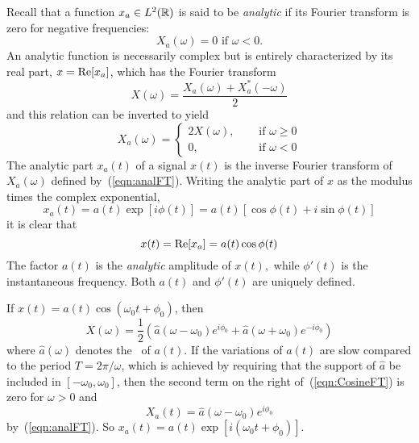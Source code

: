 Recall that 
a function $x_a \in L^2(\mathbb{R})$ is said to be \emph{analytic} if its
Fourier transform is zero for negative frequencies:
\[X_a(\omega) = 0 \text{ if } \omega < 0.\]
An analytic function is necessarily complex but is entirely
characterized by its real part, $x = \mbox{Re}[x_a]$, which has the
Fourier transform
\[X(\omega) = \frac{X_a(\omega) +
X^*_a(-\omega)}{2}\]
and this relation can be inverted to yield
\begin{equation}%
X_a(\omega) = 
    \left\{ \begin{array}{ll}
        2 X(\omega),& \quad \text{ if } \omega \geq 0\\
        0, & \quad \text{ if } \omega < 0
        \end{array} 
    \right.
\end{equation}
The analytic part $x_a(t)$ of a signal $x(t)$ is the inverse Fourier
transform of $X_a(\omega)$ defined by~(\ref{eqn:analFT}).
Writing the analytic part of $x$ as the modulus times the complex
exponential,
\[x_a(t) = a(t)\exp[i\phi(t)] = a(t)[\cos\phi(t) + i \sin\phi(t)]\]
it is clear that 
\[x(t) = \mbox{Re}[x_a] = a(t)\cos\phi(t)\]
The factor $a(t)$ is the \emph{analytic} amplitude of $x(t),$ while
$\phi'(t)$ is the instantaneous frequency.  Both $a(t)$ and $\phi'(t)$
are uniquely defined. 

\begin{example}\protect\footnotemark
{}
If $x(t) = a(t)\cos(\omega_0 t + \phi_0)$, then 
\begin{equation}\label{eqn:CosineFT} 
X(\omega)=
\frac{1}{2}\left(\hat{a}(\omega - \omega_0) e^{i \phi_0} + 
\hat{a}(\omega + \omega_0) e^{-i \phi_0} \right)
\end{equation}
where $\hat{a}(\omega)$ denotes the \FT\ of $a(t)$.
If the variations of $a(t)$ are slow compared to the period $T =
2\pi/\omega$, which is achieved by requiring that the support of
$\hat{a}$ be included in $[-\omega_0,\omega_0]$, then the second term
on the right of~(\ref{eqn:CosineFT}) is zero for $\omega>0$ and 
\[X_a(t) = \hat{a}(\omega - \omega_0) e^{i \phi_0}\]
by~(\ref{eqn:analFT}).  So $x_a(t) = a(t)\exp[i(\omega_0t+\phi_0)]$.
\end{example}

